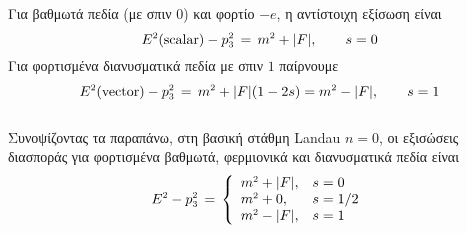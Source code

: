 Για βαθμωτά πεδία (με σπιν $0$) και φορτίο $-e$, η αντίστοιχη εξίσωση είναι 
\begin{equation}\label{scalar energy}
     E\superscr{2}(\text{scalar})-p\subscr{3}\superscr{2}\,=\,m\superscr{2}+|F|,\qquad s=0
\end{equation}
Για φορτισμένα διανυσματικά πεδία με σπιν $1$ παίρνουμε \cite{Corben:1940zz}
\begin{equation}\label{vector boson energy magnetic field}
    E\superscr{2}(\text{vector})-p\subscr{3}\superscr{2}\,=\,m\superscr{2}+|F|(1-2s)=m\superscr{2}-|F|,\qquad s=1
\end{equation}
\\
Συνοψίζοντας τα παραπάνω, στη βασική στάθμη Landau $n=0$, οι εξισώσεις διασποράς για φορτισμένα βαθμωτά, φερμιονικά και διανυσματικά  πεδία είναι
\begin{equation}
    E\superscr{2}-p\subscr{3}\superscr{2}\,=\,\left\{\begin{array}{ll}
         m\superscr{2}+|F|, &s=0 \\
         m\superscr{2}+0, & s=1/2 \\
         m\superscr{2}-|F|, & s=1
    \end{array}\right.
\end{equation}


